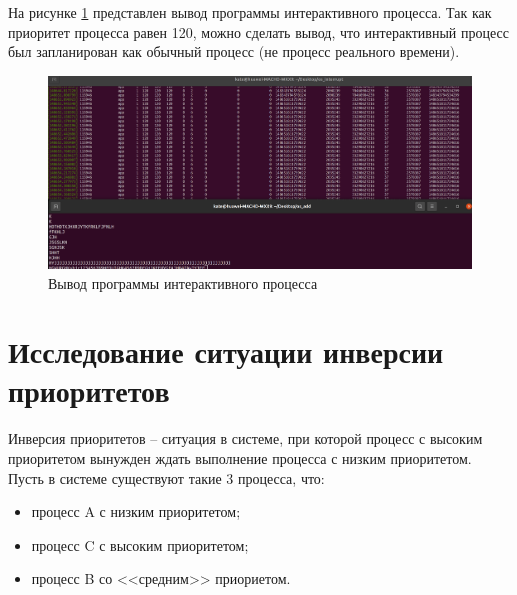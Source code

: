 

На рисунке \ref{img:interactive} представлен вывод программы интерактивного процесса. Так как приоритет процесса равен 120, можно сделать вывод, что интерактивный процесс был запланирован как обычный процесс (не процесс реального времени).

\begin{figure}[H]
	\centering
	\includegraphics[width=\linewidth]{img/interactive.png}
	\caption{Вывод программы интерактивного процесса}
	\label{img:interactive}
\end{figure}

\section{Исследование ситуации инверсии приоритетов}
Инверсия приоритетов -- ситуация в системе, при которой процесс с высоким приоритетом вынужден ждать выполнение процесса с низким приоритетом. Пусть в системе существуют такие 3 процесса, что: 
\begin{itemize}
    \item процесс A с низким приоритетом;
    \item процесс C с высоким приоритетом;
    \item процесс B со <<средним>> приориетом.
\end{itemize}

